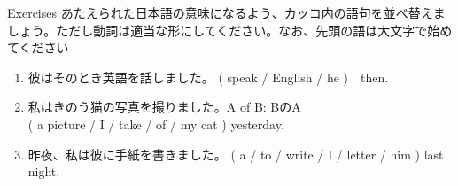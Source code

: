 \documentclass[aspectratio=169,xcolor={dvipsnames,table}]{beamer}
\newcommand{\myaudio}[1]{\href{#1}{\faVolumeUp}}
\begin{document}
\begin{frame}[plain]{Exercises}
あたえられた日本語の意味になるよう、カッコ内の語句を並べ替えましょう。ただし動詞は適当な形にしてください。なお、先頭の語は大文字で始めてください


\begin{enumerate}
 \item 彼はそのとき英語を話しました。%
\hfill{}( speak / English  / he )~~then.\\
 \item 私はきのう猫の写真を撮りました。\hfill{\scriptsize A of B: BのA}\\
\mbox{}\hfill{}( a picture / I / take / of / my cat ) yesterday.\\
 \item 昨夜、私は彼に手紙を書きました。
( a / to / write / I / letter / him ) last night.\\
\end{enumerate}
\hfill\myaudio{./audio/025_past_do_17.mp3}

\end{frame}
\end{document}
